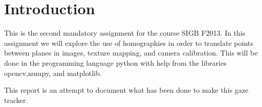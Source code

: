 \section{Introduction}

This is the second mandatory assignment for the course SIGB F2013. In this
assignment we will explore the use of homographies in order to translate points between
planes in images, texture mapping, and camera calibration. This will
be done in the programming language python with help from the libraries
opencv,numpy, and matplotlib.

This report is an attempt to document what has been done to make this gaze
tracker.

